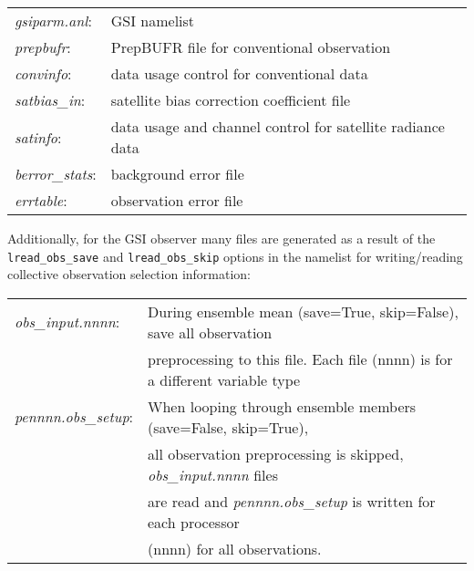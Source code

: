 \begin{table}[htbp]
\centering
\begin{tabular}{ll}

\textit{gsiparm.anl}: & GSI namelist \\

\textit{prepbufr}: & PrepBUFR file for conventional observation \\

\textit{convinfo}: & data usage control for conventional data   \\

\textit{satbias\_in}: & satellite bias correction coefficient file   \\

\textit{satinfo}: & data usage and channel control for satellite radiance data \\ 
  
\textit{berror\_stats}: & background error file  \\
 
\textit{errtable}: & observation error file \\
            
\end{tabular}
\end{table}

Additionally, for the GSI observer many files are generated as a result of the \verb|lread_obs_save| and \verb|lread_obs_skip| options in the namelist for writing/reading collective observation selection information:

\begin{table}[htbp]
\centering
\begin{tabular}{ll}

\textit{obs\_input.nnnn}: & During ensemble mean (save=True, skip=False), save all observation \\
                                       & preprocessing to this file. Each file (nnnn) is for a different variable type\\
                                      

\textit{pennnn.obs\_setup}: &  When looping through ensemble members (save=False, skip=True), \\
                                            & all observation preprocessing is skipped, \textit{obs\_input.nnnn} files \\
                                            & are read and \textit{pennnn.obs\_setup} is written for each processor \\
                                            & (nnnn) for all observations.

\end{tabular}
\end{table}


